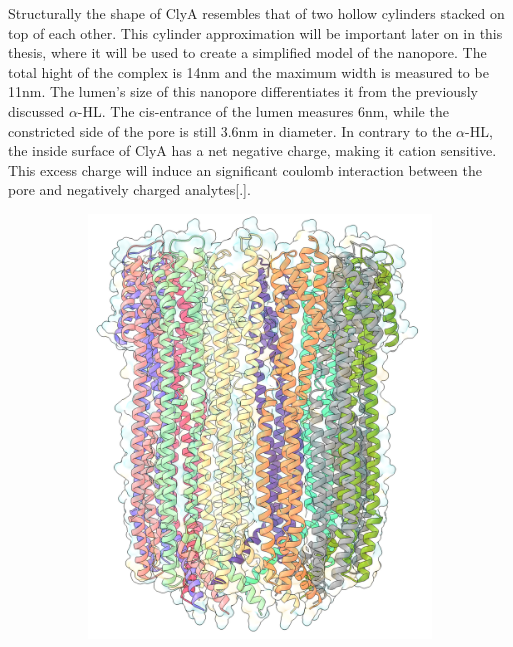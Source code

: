 Structurally the shape of ClyA resembles that of two hollow cylinders stacked on top of
each other. This cylinder approximation will be important later on in this thesis, where
it will be used to create a simplified model of the nanopore. The total hight of the
complex is 14nm and the maximum width is measured to be 11nm. The lumen's size of this
nanopore differentiates it from the previously discussed $\alpha$-HL. The cis-entrance of
the lumen measures 6nm, while the constricted side of the pore is still 3.6nm in
diameter.  In contrary to the $\alpha$-HL, the inside surface of ClyA has a net negative
charge, making it cation sensitive. This excess charge will induce an significant coulomb
interaction between the pore and negatively charged analytes[.].
\begin{figure}[ht]
  \begin{centering}
  \begin{subfigure}[t]{\dimexpr.4\linewidth-1.3em\relax}
  \centering
  \includegraphics[width=\linewidth,valign=t]{Figures/clya-front-c.png}

\end{subfigure}
\end{centering}
\end{figure}
